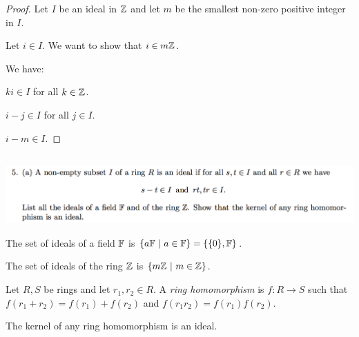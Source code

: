 \documentclass[12pt]{article}
\begin{document}
\begin{proof}
  Let $I$ be an ideal in $\mathbb{Z}$ and let $m$ be the smallest non-zero positive integer in $I$.



  Let $i \in I$. We want to show that $i \in m\mathbb{Z}$.

  We have:

  $ki \in I$ for all $k \in \mathbb{Z}$.

  $i - j \in I$ for all $j \in I$.

  $i - m \in I$.





\end{proof}


\newpage
\subsection*{} %
\begin{mdframed}
  \includegraphics[width=400pt]{img/linear-algebra-a0-1-5-a.png}\\
\end{mdframed}

The set of ideals of a field $\mathbb{F}$ is $\{a\mathbb{F} ~|~ a \in \mathbb{F}\} = \{\{0\}, \mathbb{F}\}$.

The set of ideals of the ring $\mathbb{Z}$ is $\{m\mathbb{Z} ~|~ m \in \mathbb{Z}\}$.


\begin{definition*}
  Let $R, S$ be rings and let $r_1, r_2 \in R$. A \emph{ring homomorphism} is $f:R \to S$ such that
  $f(r_1 + r_2) = f(r_1) + f(r_2)$ and $f(r_1r_2) = f(r_1)f(r_2)$.
\end{definition*}

\begin{claim*}
  The kernel of any ring homomorphism is an ideal.
\end{claim*}
\end{document}
